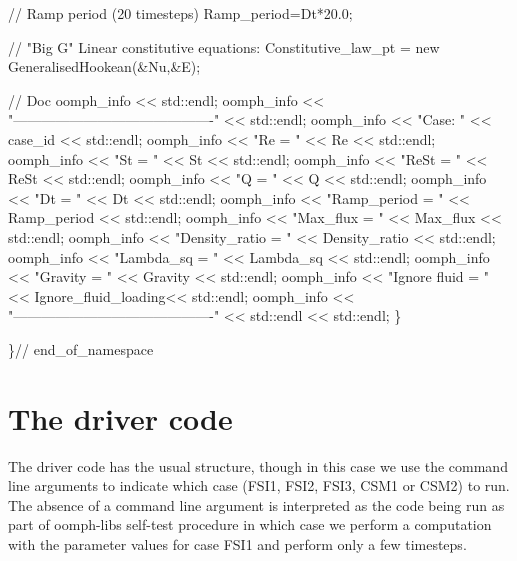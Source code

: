 \begin{DoxyCodeInclude}
  \textcolor{comment}{// Ramp period (20 timesteps)}
  Ramp\_period=Dt*20.0;

  \textcolor{comment}{// "Big G" Linear constitutive equations:}
  Constitutive\_law\_pt = \textcolor{keyword}{new} GeneralisedHookean(&Nu,&E);
  
  \textcolor{comment}{// Doc}
  oomph\_info << std::endl;
  oomph\_info << \textcolor{stringliteral}{"-------------------------------------------"} 
             << std::endl;
  oomph\_info << \textcolor{stringliteral}{"Case: "} << case\_id << std::endl;
  oomph\_info << \textcolor{stringliteral}{"Re            = "} << Re << std::endl;
  oomph\_info << \textcolor{stringliteral}{"St            = "} << St << std::endl;
  oomph\_info << \textcolor{stringliteral}{"ReSt          = "} << ReSt << std::endl;
  oomph\_info << \textcolor{stringliteral}{"Q             = "} << Q << std::endl;
  oomph\_info << \textcolor{stringliteral}{"Dt            = "} << Dt << std::endl;
  oomph\_info << \textcolor{stringliteral}{"Ramp\_period   = "} << Ramp\_period << std::endl;
  oomph\_info << \textcolor{stringliteral}{"Max\_flux      = "} << Max\_flux << std::endl;
  oomph\_info << \textcolor{stringliteral}{"Density\_ratio = "} << Density\_ratio << std::endl;
  oomph\_info << \textcolor{stringliteral}{"Lambda\_sq     = "} << Lambda\_sq << std::endl;
  oomph\_info << \textcolor{stringliteral}{"Gravity       = "} << Gravity << std::endl;
  oomph\_info << \textcolor{stringliteral}{"Ignore fluid  = "} << Ignore\_fluid\_loading<< std::endl;
  oomph\_info << \textcolor{stringliteral}{"-------------------------------------------"}
             << std::endl << std::endl;
 \}

\}\textcolor{comment}{// end\_of\_namespace}

\end{DoxyCodeInclude}




 

\hypertarget{index_driver}{}\section{The driver code}\label{index_driver}
The driver code has the usual structure, though in this case we use the command line arguments to indicate which case (F\+S\+I1, F\+S\+I2, F\+S\+I3, C\+S\+M1 or C\+S\+M2) to run. The absence of a command line argument is interpreted as the code being run as part of {\ttfamily oomph-\/lib\textquotesingle{}s} self-\/test procedure in which case we perform a computation with the parameter values for case F\+S\+I1 and perform only a few timesteps.


